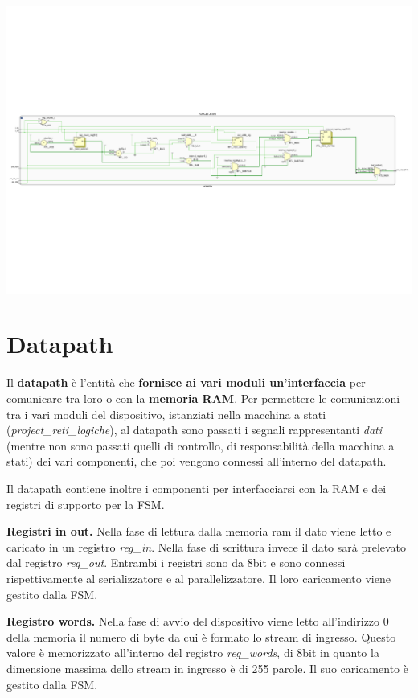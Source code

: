 \documentclass[a4paper]{report}
\begin{document}
\includegraphics[scale = 0.45]{schematics/parallelizer.pdf}

\section{Datapath}
Il \textbf{datapath} è l'entità che \textbf{fornisce ai vari moduli un'interfaccia} per comunicare tra loro o con la \textbf{memoria RAM}.
Per permettere le comunicazioni tra i vari moduli del dispositivo, istanziati nella macchina a stati (\textit{project\_reti\_logiche}), al datapath sono passati i segnali rappresentanti \textit{dati} (mentre non sono passati quelli di controllo, di responsabilità della macchina a stati) dei vari componenti, che poi vengono connessi all'interno del datapath.

Il datapath contiene inoltre i componenti per interfacciarsi con la RAM e dei registri di supporto per la FSM.
 
\textbf{Registri in out.} Nella fase di lettura dalla memoria ram il dato viene letto e caricato in un registro \textit{reg\_in}. Nella fase di scrittura invece il dato sarà prelevato dal registro \textit{reg\_out}. Entrambi i registri sono da 8bit e sono connessi rispettivamente al serializzatore e al parallelizzatore. Il loro caricamento viene gestito dalla FSM.

\textbf{Registro words.} Nella fase di avvio del dispositivo viene letto all'indirizzo 0 della memoria il numero di byte da cui è formato lo stream di ingresso. Questo valore è memorizzato all'interno del registro \textit{reg\_words}, di 8bit in quanto la dimensione massima dello stream in ingresso è di 255 parole. Il suo caricamento è gestito dalla FSM.
\end{document}
